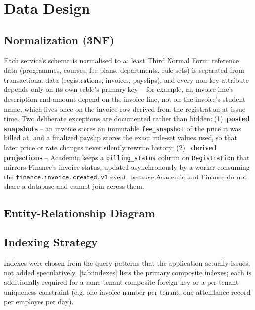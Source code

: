 \section{Data Design}
\label{sec:data-design}

\subsection{Normalization (3NF)}
Each service's schema is normalised to at least Third Normal Form: reference
data (programmes, courses, fee plans, departments, rule sets) is separated
from transactional data (registrations, invoices, payslips), and every
non-key attribute depends only on its own table's primary key -- for
example, an invoice line's description and amount depend on the invoice
line, not on the invoice's student name, which lives once on the invoice
row derived from the registration at issue time. Two deliberate exceptions
are documented rather than hidden: (1)~\textbf{posted snapshots} -- an
invoice stores an immutable \texttt{fee\_snapshot} of the price it was
billed at, and a finalized payslip stores the exact rule-set values used,
so that later price or rate changes never silently rewrite history; (2)~
\textbf{derived projections} -- Academic keeps a \texttt{billing\_status}
column on \texttt{Registration} that mirrors Finance's invoice status, updated
asynchronously by a worker consuming the \texttt{finance.invoice.created.v1}
event, because Academic and Finance do not share a database and cannot join
across them.

\subsection{Entity-Relationship Diagram}

\subsection{Indexing Strategy}
Indexes were chosen from the query patterns that the application actually
issues, not added speculatively. \cref{tab:indexes} lists the primary
composite indexes; each is additionally required for a same-tenant composite
foreign key or a per-tenant uniqueness constraint (e.g. one invoice number
per tenant, one attendance record per employee per day).

